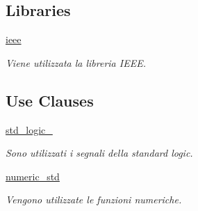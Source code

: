 \subsection*{Libraries}
 \begin{DoxyCompactItemize}
\item 
\mbox{\label{classGPIO__v1__0_a0a6af6eef40212dbaf130d57ce711256}} 
\hyperlink{classGPIO__v1__0_a0a6af6eef40212dbaf130d57ce711256}{ieee} 
\begin{DoxyCompactList}\small\item\em Viene utilizzata la libreria I\+E\+EE. \end{DoxyCompactList}\end{DoxyCompactItemize}
\subsection*{Use Clauses}
 \begin{DoxyCompactItemize}
\item 
\mbox{\label{classGPIO__v1__0_acd03516902501cd1c7296a98e22c6fcb}} 
\hyperlink{classGPIO__v1__0_acd03516902501cd1c7296a98e22c6fcb}{std\+\_\+logic\+\_}   
\begin{DoxyCompactList}\small\item\em Sono utilizzati i segnali della standard logic. \end{DoxyCompactList}\item 
\mbox{\label{classGPIO__v1__0_a2edc34402b573437d5f25fa90ba4013e}} 
\hyperlink{classGPIO__v1__0_a2edc34402b573437d5f25fa90ba4013e}{numeric\+\_\+std}   
\begin{DoxyCompactList}\small\item\em Vengono utilizzate le funzioni numeriche. \end{DoxyCompactList}\end{DoxyCompactItemize}
